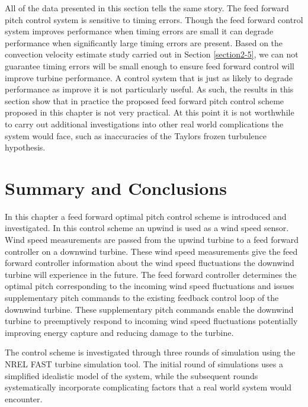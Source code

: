 All of the data presented in this section tells the same story. The feed forward pitch control system is sensitive to timing errors. Though the feed forward control system improves performance when timing errors are small it can degrade performance when significantly large timing errors are present. Based on the convection velocity estimate study carried out in Section \ref{section2-5}, we can not guarantee timing errors will be small enough to ensure feed forward control will improve turbine performance. A control system that is just as likely to degrade performance as improve it is not particularly useful. As such, the results in this section show that in practice the proposed feed forward pitch control scheme proposed in this chapter is not very practical. At this point it is not worthwhile to carry out additional investigations into other real world complications the system would face, such as inaccuracies of the Taylors frozen turbulence hypothesis.

\section{Summary and Conclusions}

In this chapter a feed forward optimal pitch control scheme is introduced and investigated. In this control scheme an upwind is used as a wind speed sensor. Wind speed measurements are passed from the upwind turbine to a feed forward controller on a downwind turbine. These wind speed measurements give the feed forward controller information about the wind speed fluctuations the downwind turbine will experience in the future. The feed forward controller determines the optimal pitch corresponding to the incoming wind speed fluctuations and issues supplementary pitch commands to the existing feedback control loop of the downwind turbine. These supplementary pitch commands enable the downwind turbine to preemptively respond to incoming wind speed fluctuations potentially improving energy capture and reducing damage to the turbine.

The control scheme is investigated through three rounds of simulation using the NREL FAST turbine simulation tool. The initial round of simulations uses a simplified idealistic model of the system, while the subsequent rounds systematically incorporate complicating factors that a real world system would encounter.  

